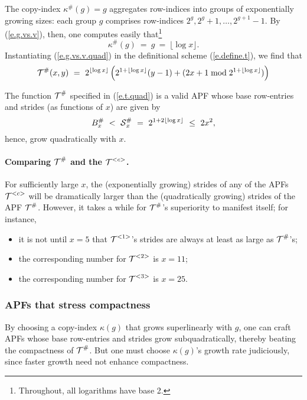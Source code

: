 The copy-index $\kappa^\#(g) = g$ aggregates row-indices into groups
of exponentially growing sizes: each group $g$ comprises row-indices
$2^g, 2^g +1, \ldots, 2^{g+1} -1$.  By (\ref{e.g.vs.v}), then, one
computes easily that\footnote{Throughout, all logarithms have base 2.}
\begin{equation}
\label{e.g.vs.v.quad}
\kappa^\#(g) \ = \ g \ = \ \lfloor \log x \rfloor .
\end{equation}
Instantiating (\ref{e.g.vs.v.quad}) in the definitional scheme
(\ref{e.define.t}), we find that
\begin{equation}
\label{e.t.quad}
\mbox{$\cal T$}^\#(x, y) \ = \
2^{\lfloor \log x \rfloor} \left( 2^{1 +
	\lfloor \log x \rfloor} (y-1) + (2x+1 \bmod 2^{1 + \lfloor
	\log x \rfloor}) \right)
\end{equation}

\begin{prop}
\label{p.k.quad}
The function $\mbox{$\cal T$}^\#$ specified in (\ref{e.t.quad}) is a valid APF
whose base row-entries and strides (as functions of $x$) are given by
\[ B^\#_x \ < \
\mbox{$\cal S$}^\#_x \ = \ 2^{1 + 2 \lfloor \log x \rfloor} \ \leq \ 2x^2 ,  \]
hence, grow quadratically with $x$.
\end{prop}

\paragraph{Comparing $\mbox{$\cal T$}^\#$ and the $\mbox{$\cal T$}^{<c>}$.}
For sufficiently large $x$, the (exponentially growing) strides of any
of the APFs $\mbox{$\cal T$}^{<c>}$ will be dramatically larger than the
(quadratically growing) strides of the APF $\mbox{$\cal T$}^\#$.  However, it takes
a while for $\mbox{$\cal T$}^\#$'s superiority to manifest itself; for instance,
\begin{itemize}
\item
it is not until $x = 5$ that $\mbox{$\cal T$}^{<1>}$'s strides are always at least
as large as $\mbox{$\cal T$}^\#$'s;
\item
the corresponding number for $\mbox{$\cal T$}^{<2>}$ is $x = 11$;
\item
the corresponding number for $\mbox{$\cal T$}^{<3>}$ is $x = 25$.
\end{itemize}

\subsubsection{APFs that stress compactness}

By choosing a copy-index $\kappa(g)$ that grows superlinearly with
$g$, one can craft APFs whose base row-entries and strides grow
subquadratically, thereby beating the compactness of $\mbox{$\cal T$}^\#$.  But one
must choose $\kappa(g)$'s growth rate judiciously, since faster growth
need not enhance compactness.

